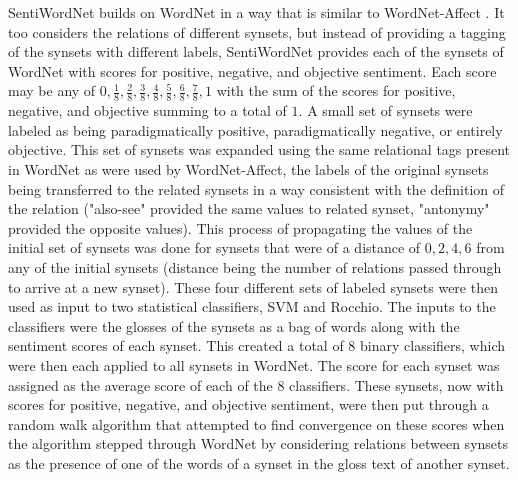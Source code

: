 \documentclass[letterpaper, 10 pt, conference]{ieeeconf}
\begin{document}
SentiWordNet builds on WordNet in a way that is similar to WordNet-Affect \textcolor{gray}{\cite{Esuli,Baccianella}}. It too considers the relations of different synsets, but instead of providing a tagging of the synsets with different labels, SentiWordNet provides each of the synsets of WordNet with scores for positive, negative, and objective sentiment. Each score may be any of $0, \frac{1}{8}, \frac{2}{8}, \frac{3}{8}, \frac{4}{8}, \frac{5}{8}, \frac{6}{8}, \frac{7}{8}, 1$ with the sum of the scores for positive, negative, and objective summing to a total of $1$. A small set of synsets were labeled as being paradigmatically positive, paradigmatically negative, or entirely objective. This set of synsets was expanded using the same relational tags present in WordNet as were used by WordNet-Affect, the labels of the original synsets being transferred to the related synsets in a way consistent with the definition of the relation ("also-see" provided the same values to related synset, "antonymy" provided the opposite values). This process of propagating the values of the initial set of synsets was done for synsets that were of a distance of $0, 2, 4, 6$ from any of the initial synsets (distance being the number of relations passed through to arrive at a new synset). These four different sets of labeled synsets were then used as input to two statistical classifiers, SVM and Rocchio. The inputs to the classifiers were the glosses of the synsets as a bag of words along with the sentiment scores of each synset. This created a total of $8$ binary classifiers, which were then each applied to all synsets in WordNet. The score for each synset was assigned as the average score of each of the $8$ classifiers. These synsets, now with scores for positive, negative, and objective sentiment, were then put through a random walk algorithm that attempted to find convergence on these scores when the algorithm stepped through WordNet by considering relations between synsets as the presence of one of the words of a synset in the gloss text of another synset.
\end{document}
